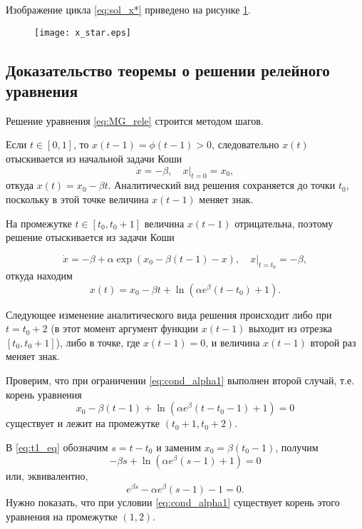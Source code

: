 Изображение цикла \eqref{eq:sol_x*} приведено на рисунке \ref{fig:x_star}.

\begin{figure}
\centering
  \texttt{[image: x\_star.eps]}
  \label{fig:x_star}
\end{figure}


\subsection{Доказательство теоремы о решении релейного уравнения}

Решение уравнения \eqref{eq:MG_rele} строится методом шагов.

Если $t \in [0, 1]$, то $x(t - 1) = \phi(t - 1) > 0$, следовательно $x(t)$ отыскивается из начальной задачи Коши
\begin{equation}
    \dot{x} = -\beta, \quad x|_{t = 0} = x_0,
\end{equation}
откуда $x(t) = x_0 - \beta t$. Аналитический вид решения сохраняется до точки $t_0$, поскольку в этой точке величина $x(t - 1)$ меняет знак.

На промежутке $t \in [t_0, t_0 + 1]$ величина $x(t - 1)$ отрицательна, поэтому решение отыскивается из задачи Коши

\begin{equation}
    \dot{x} = -\beta + \alpha\exp(x_0 - \beta(t - 1) - x), \quad x|_{t = t_0} = -\beta,
\end{equation}
откуда находим
\begin{equation}
    x(t) = x_0-\beta t +\ln(\alpha e^{\beta}(t-t_0)+1).
\end{equation}

Следующее изменение аналитического вида решения происходит либо при $t = t_0 + 2$ (в этот момент аргумент функции $x(t - 1)$ выходит из отрезка $[t_0, t_0 + 1]$), либо в точке, где $x(t - 1) = 0$, и величина $x(t - 1)$ второй раз меняет знак.

Проверим, что при ограничении \eqref{eq:cond_alpha1} выполнен второй случай, т.е. корень уравнения
\begin{equation}
\label{eq:t1_eq}
    x_0-\beta (t - 1) +\ln(\alpha e^{\beta}(t - t_0 - 1) + 1) = 0
\end{equation}
существует и лежит на промежутке $(t_0 + 1, t_0 + 2)$.

В \eqref{eq:t1_eq} обозначим $s = t - t_0$ и заменим $x_0 = \beta(t_0 - 1)$, получим
$$-\beta s + \ln(\alpha e^{\beta} (s - 1) + 1) = 0$$
%
или, эквивалентно,
%
\begin{equation}
\label{eq:t1_eq2}
e^{\beta s} - \alpha e^{\beta} (s - 1) - 1 = 0.
\end{equation}
Нужно показать, что при условии \eqref{eq:cond_alpha1} существует корень этого уравнения на промежутке $(1, 2)$.

